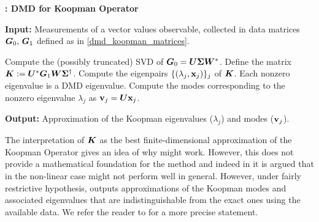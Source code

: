 \begin{algorithm}[h]
\caption{\textbf{: DMD for Koopman Operator}}
\label{alg_koopman_dmd}
\textbf{Input:} Measurements of a vector values observable, collected in data matrices $\vb*{G}_0,\,\vb*{G}_1$ defined as in \eqref{dmd_koopman_matrices}.
\begin{algorithmic}[1]
\State Compute the (possibly truncated) SVD of $\vb*{G}_0 = \vb*{U}\vb*{\Sigma}\vb*{W}^*$.
\State Define the matrix $\vb*{K} := \vb*{U}^*\vb*{G}_1\vb*{W}\vb*{\Sigma}^{\dagger}$.
\State Compute the eigenpairs $\{(\lambda_j, \vb{x}_j)\}_j$ of $\vb*{K}$. Each nonzero eigenvalue is a DMD eigenvalue.
\State Compute the modes corresponding to the nonzero eigenvalue $\lambda_j$ as $\vb{v}_j = \vb*{U}\vb{x}_j$. 
\end{algorithmic}
\textbf{Output:} Approximation of the Koopman eigenvalues ($\lambda_j$) and modes ($\vb{v}_j$).
\end{algorithm}


The interpretation of $\vb*{K}$ as the best finite-dimensional approximation of the Koopman Operator gives an idea of why  might work. However, this does not provide a mathematical foundation for the method and indeed in \cite{tu_dynamic_2014, bagheri_koopman-mode_2013} it is argued that in the non-linear case  might not perform well in general. However, under fairly restrictive hypothesis,  outputs approximations of the Koopman modes and associated eigenvalues that are indistinguishable from the exact ones using the available data. We refer the reader to \cite{rowley_spectral_2009, tu_dynamic_2014} for a more precise statement.

